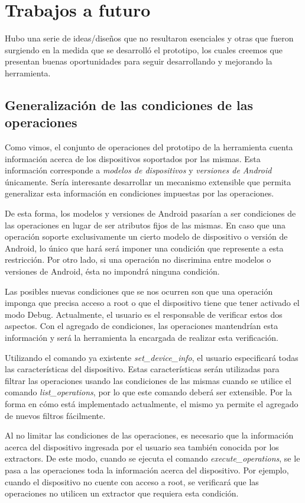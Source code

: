 \chapter{Trabajos a futuro}
Hubo una serie de ideas/diseños que no resultaron esenciales y otras que fueron surgiendo en la medida que se desarrolló el prototipo, los cuales creemos que presentan buenas oportunidades para seguir desarrollando y mejorando la herramienta.

\section{Generalización de las condiciones de las operaciones}
Como vimos, el conjunto de operaciones del prototipo de la herramienta cuenta información acerca de los dispositivos soportados por las mismas. Esta información corresponde a \emph{modelos de dispositivos} y \emph{versiones de Android} únicamente. Sería interesante desarrollar un mecanismo extensible que permita generalizar esta información en condiciones impuestas por las operaciones. 

De esta forma, los modelos y versiones de Android pasarían a ser condiciones de las operaciones en lugar de ser atributos fijos de las mismas. En caso que una operación soporte exclusivamente un cierto modelo de dispositivo o versión de Android, lo único que hará será imponer una condición que represente a esta restricción. Por otro lado, si una operación no discrimina entre modelos o versiones de Android, ésta no impondrá ninguna condición.

Las posibles nuevas condiciones que se nos ocurren son que una operación imponga que precisa acceso a root o que el dispositivo tiene que tener activado el modo Debug. Actualmente, el usuario es el responsable de verificar estos dos aspectos. Con el agregado de condiciones, las operaciones mantendrían esta información y será la herramienta la encargada de realizar esta verificación. 

Utilizando el comando ya existente \emph{set\_device\_info}, el usuario especificará todas las características del dispositivo. Estas características serán utilizadas para filtrar las operaciones usando las condiciones de las mismas cuando se utilice el comando \emph{list\_operations}, por lo que este comando deberá ser extensible. Por la forma en cómo está implementado actualmente, el mismo ya permite el agregado de nuevos filtros fácilmente. 

Al no limitar las condiciones de las operaciones, es necesario que la información acerca del dispositivo ingresada por el usuario sea también conocida por los extractors. De este modo, cuando se ejecuta el comando \emph{execute\_operations}, se le pasa a las operaciones toda la información acerca del dispositivo. Por ejemplo, cuando el dispositivo no cuente con acceso a root, se verificará que las operaciones no utilicen un extractor que requiera esta condición.

